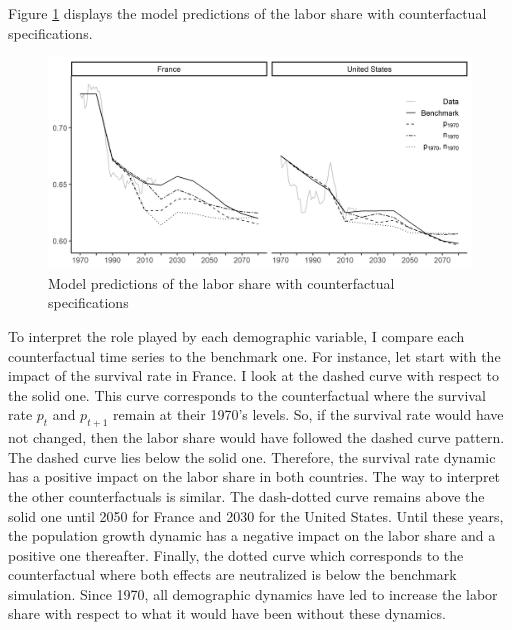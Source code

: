 Figure \ref{fig:counter_PGSR_1970} displays the model predictions of the labor share with counterfactual specifications.
\begin{figure}[tb]
	\centering
	\includegraphics[width=1\linewidth]{../result/decomposition/counter_PGSR.png}
	\caption{Model predictions of the labor share with counterfactual specifications}
	\label{fig:counter_PGSR_1970}
\end{figure}
To interpret the role played by each demographic variable, I compare each counterfactual time series to the benchmark one. For instance, let start with the impact of the survival rate in France. I look at the dashed curve with respect to the solid one. This curve corresponds to the counterfactual where the survival rate $p_t$ and $p_{t+1}$ remain at their 1970's levels. So, if the survival rate would have not changed, then the labor share would have followed the dashed curve pattern. 
The dashed curve lies below the solid one. Therefore, the survival rate dynamic has a positive impact on the labor share in both countries.
The way to interpret the other counterfactuals is similar.
The dash-dotted curve remains above the solid one until 2050 for France and 2030 for the United States. Until these years, the population growth dynamic has a negative impact on the labor share and a positive one thereafter.
Finally, the dotted curve which corresponds to the counterfactual where both effects are neutralized is below the benchmark simulation. Since 1970, all demographic dynamics have led to increase the labor share with respect to what it would have been without these dynamics.
